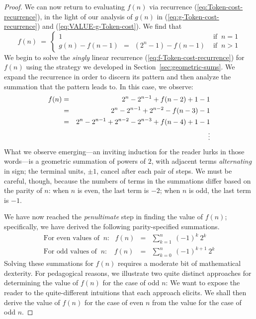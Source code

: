 \begin{proof}
We can now return to evaluating $f(n)$ via recurrence (\ref{eq:Token-cost-recurrence}), in the light of our analysis of $g(n)$ in (\ref{eq:g-Token-cost-recurrence}) and
(\ref{eq:VALUE-g-Token-cost}).  We find that 
\begin{equation}
\label{eq:f-Token-cost-recurrence}
f(n) \ = \ \left\{
\begin{array}{ll}
1 & \mbox{ if } \ n=1 \\
g(n) - f(n-1) \ \ = \ \
\left(2^{n} -1\right) - f(n-1) & \mbox{ if } \ n>1
\end{array}
\right.
\end{equation}
We begin to solve the {\em singly} linear recurrence (\ref{eq:f-Token-cost-recurrence}) for $f(n)$ using the strategy we developed in Section~\ref{sec:geometric-sums}.  We expand the recurrence in order to discern its pattern and then analyze the summation that the pattern leads to.  In this case, we observe:
\begin{eqnarray*}
f(n) & = & 2^{n} - 2^{n-1} + f(n-2) + 1 -1 \\
     & = & 2^{n} - 2^{n-1} + 2^{n-2} - f(n-3) -1 \\
     & = & 2^{n} - 2^{n-1} + 2^{n-2} - 2^{n-3} + f(n-4) +1-1 \\
     &    & \hspace*{.35in}  \vdots
\end{eqnarray*}
What we observe emerging---an inviting induction for the reader lurks in those words---is a geometric summation of powers of $2$, with adjacent terms {\em alternating} in sign; the terminal units, $\pm 1$, cancel after each pair of steps.  We must be careful, though, because
the numbers of terms in the summations differ based on the parity of $n$: when $n$ is even, the last term is $-2$; when $n$ is odd, the last term is $-1$.

\smallskip

We have now reached the {\em penultimate} step in finding the value of $f(n)$; specifically, we have derived the following parity-specified summations.
\begin{eqnarray}
\label{eq:EVEN-f-sum}
\mbox{For even values of } \ n: \ \ \
f(n) & = &
\sum_{k=1}^n \ (-1)^{k} \ 2^{k} \\
\label{eq:ODD-f-sum}
\mbox{For odd values of } \ n: \ \ \ \
f(n) & = &
\sum_{k=0}^n \ (-1)^{k+1} \ 2^{k}
\end{eqnarray}
Solving these summations for $f(n)$ requires a moderate bit of mathematical dexterity.  For pedagogical reasons, we illustrate two quite distinct approaches for determining the value of
$f(n)$ for the case of odd $n$:   We want to expose the reader to the quite-different intuitions that each approach elicits.  We shall then derive the value of $f(n)$ for the case of even $n$ from the value for the case of odd $n$.


\end{proof}
